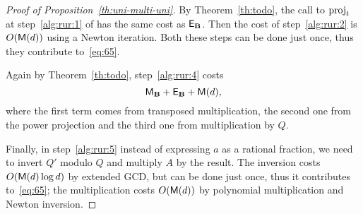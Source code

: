 \begin{proof}[Proof of Proposition~\ref{th:uni-multi-uni}]
  By Theorem~\ref{th:todo}, the call to $\operatorname{proj}_t$ at
  step~\ref{alg:rur:1} of  has the same cost as
  $\mathsf{E}_{\mathbf{B}}$. Then the cost of step~\ref{alg:rur:2} is
  $O(\mathsf{M}(d))$ using a Newton iteration. Both these steps can be done
  just once, thus they contribute to~\eqref{eq:65}.

  Again by Theorem~\ref{th:todo}, step~\ref{alg:rur:4} costs
  \begin{equation}
    \label{eq:80}
    \mathsf{M}_{\mathbf{B}} + \mathsf{E}_{\mathbf{B}} + \mathsf{M}(d)
    \text{,}
  \end{equation}
  where the first term comes from transposed multiplication, the
  second one from the power projection and the third one from
  multiplication by $Q$.

  Finally, in step~\ref{alg:rur:5} instead of expressing $a$ as a
  rational fraction, we need to invert $Q'$ modulo $Q$ and multiply
  $A$ by the result. The inversion costs $O(\mathsf{M}(d)\log d)$ by
  extended GCD, but can be done just once, thus it contributes
  to~\eqref{eq:65}; the multiplication costs $O(\mathsf{M}(d))$ by
  polynomial multiplication and Newton inversion.
\end{proof}



